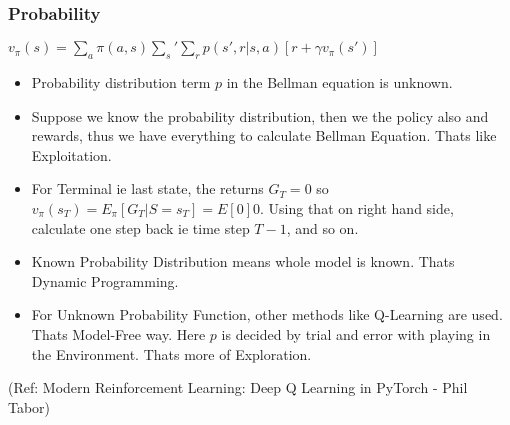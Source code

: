 \begin{frame}[fragile]\frametitle{Probability}

$v_{\pi}(s) = \sum_a \pi(a,s) \sum_s' \sum_r p(s',r|s,a) [r + \gamma v_{\pi}(s')]$

\begin{itemize}
\item Probability distribution term $p$ in the Bellman equation is unknown.
\item Suppose we know the probability distribution, then we the policy also and rewards, thus we have everything to calculate Bellman Equation. Thats like Exploitation.
\item For Terminal ie last state, the returns $G_T = 0$ so $v_{\pi}(s_T) = E_{\pi}[G_T|S=s_T] =E[0] 0$. Using that on right hand side, calculate one step back ie time step $T-1$, and so on.
\item Known Probability Distribution means whole model is known. Thats Dynamic Programming.
\item For Unknown Probability Function, other methods like Q-Learning are used. Thats Model-Free way. Here $p$ is decided by trial and error with playing in the Environment. Thats more of Exploration.
\end{itemize}

{\tiny (Ref: Modern Reinforcement Learning: Deep Q Learning in PyTorch - Phil Tabor)}

\end{frame}

